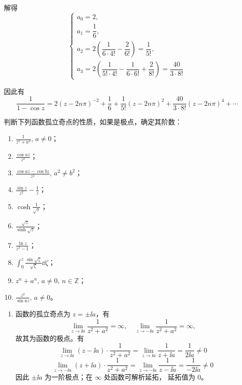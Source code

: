 \begin{question}
\begin{solution}
\begin{enumerate}
解得
\[
\begin{cases}
a_0 = 2,\\
a_1 = \dfrac{1}{6},\\
a_2 = 2\left(\dfrac{1}{6\cdot 4!} - \dfrac{2}{6!}\right) = \dfrac{1}{5!},\\
a_3 = 2\left(\dfrac{1}{5!\cdot 4!} - \dfrac{1}{6\cdot 6!} + \dfrac{2}{8!}\right) = \dfrac{40}{3\cdot 8!}
\end{cases}
\]

因此有
\[
\frac{1}{1-\cos z}
= 2(z-2n\pi)^{-2} + \frac{1}{6} + \frac{1}{5!}(z-2n\pi)^2 + \frac{40}{3\cdot 8!}(z-2n\pi)^4 + \cdots
\]
\end{enumerate}
\end{solution}
\end{question}

\begin{question}
判断下列函数孤立奇点的性质，如果是极点，确定其阶数：

\begin{enumerate}
  \item \(\displaystyle\frac{1}{z^2+a^2},\,a\neq 0\)；

  \item \(\displaystyle\frac{\cos a z}{z^2}\)；

  \item \(\displaystyle\frac{\cos a z - \cos b z}{z^2},\,a^2\neq b^2\)；

  \item \(\displaystyle\frac{\sin z}{z^2} - \frac{1}{z}\)；

  \item \(\displaystyle\cosh\frac{1}{\sqrt{z}}\)；

  \item \(\displaystyle\frac{\sqrt{z}}{\sinh\sqrt{z}}\)；

  \item \(\displaystyle\frac{\ln z}{z^2-1}\)；

  \item \(\displaystyle\int_0^z \frac{\sin\sqrt{\zeta}}{\sqrt{\zeta}}\dd{}\zeta\)；

  \item \(\displaystyle z^n + a^n,\,a\neq 0,\,n\in\mathbb{Z}\)；

  \item \(\displaystyle\frac{z^2}{\sin a z},\,a\neq 0\)。

\end{enumerate}
\begin{solution}
\begin{enumerate}
  \item 函数的孤立奇点为 \(z=\pm \ii a\)，有
\[
\lim_{z\to\ii a} \frac{1}{z^2+a^2} = \infty,\quad
\lim_{z\to-\ii a} \frac{1}{z^2+a^2} = \infty,
\]
故其为函数的极点。有
\[
\lim_{z\to\ii a} (z-\ii a) \cdot \frac{1}{z^2+a^2}
= \lim_{z\to\ii a} \frac{1}{z+\ii a} = \frac{1}{2\ii a} \neq 0
\]
\[
\lim_{z\to-\ii a} (z+\ii a) \cdot \frac{1}{z^2+a^2}
= \lim_{z\to-\ii a} \frac{1}{z-\ii a} = \frac{1}{-2\ii a} \neq 0
\]
因此 \(\pm \ii a\) 为一阶极点；在 \(\infty\) 处函数可解析延拓，
延拓值为 \(0\)。


\end{enumerate}
\end{solution}
\end{question}
